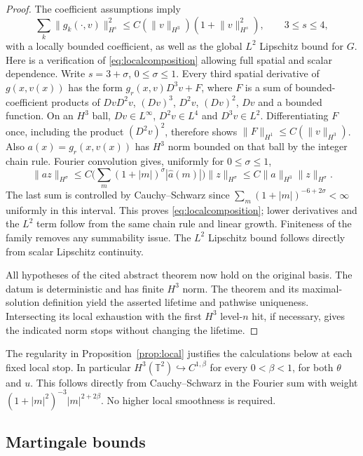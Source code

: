 \documentclass[11pt]{amsart}
\theoremstyle{remark}
\numberwithin{equation}{section}
\newcommand{\T}{\mathbb T}
\newcommand{\norm}[1]{\lVert#1\rVert}
\begin{document}
\begin{proof}
The coefficient assumptions imply
\begin{equation}\label{eq:localcomposition}
 \sum_k\norm{g_k(\cdot,v)}_{H^s}^2
 \leq C(\norm{v}_{H^3})(1+\norm{v}_{H^s}^2),\qquad 3\leq s\leq4,
\end{equation}
with a locally bounded coefficient, as well as the global $L^2$ Lipschitz
bound for $G$. Here is a verification of \eqref{eq:localcomposition} allowing
full spatial and scalar dependence. Write $s=3+\sigma$, $0\leq\sigma\leq1$.
Every third spatial derivative of $g(x,v(x))$ has the form
$g_r(x,v)D^3v+F$, where $F$ is a sum of bounded-coefficient products of
$DvD^2v$, $(Dv)^3$, $D^2v$, $(Dv)^2$, $Dv$ and a bounded function.
On an $H^3$ ball, $Dv\in L^\infty$, $D^2v\in L^4$ and $D^3v\in L^2$.
Differentiating $F$ once, including the product $(D^2v)^2$, therefore shows
$\norm{F}_{H^1}\leq C(\norm{v}_{H^3})$.
Also $a(x)=g_r(x,v(x))$ has $H^3$ norm bounded on that ball by the integer
chain rule. Fourier convolution gives, uniformly for $0\leq\sigma\leq1$,
\[
 \norm{az}_{H^\sigma}\leq
 C\Big(\sum_m(1+|m|)^\sigma|\widehat a(m)|\Big)\norm{z}_{H^\sigma}
 \leq C\norm{a}_{H^3}\norm{z}_{H^\sigma}.
\]
The last sum is controlled by Cauchy--Schwarz since
$\sum_m(1+|m|)^{-6+2\sigma}<\infty$ uniformly in this interval.
This proves \eqref{eq:localcomposition}; lower derivatives and the $L^2$ term
follow from the same chain rule and linear growth. Finiteness of the family
removes any summability issue. The $L^2$ Lipschitz bound follows directly from
scalar Lipschitz continuity.

All hypotheses of the cited abstract theorem now hold on the original basis.
The datum is deterministic and has finite $H^3$ norm. The theorem and its
maximal-solution definition yield the asserted lifetime and pathwise uniqueness.
Intersecting its local exhaustion with the first $H^3$ level-$n$ hit, if
necessary, gives the indicated norm stops without changing the lifetime.
\end{proof}

The regularity in Proposition~\ref{prop:local} justifies the calculations below
at each fixed local stop. In particular $H^3(\T^2)\hookrightarrow C^{1,\beta}$
for every $0<\beta<1$, for both $\theta$ and $u$. This follows directly from
Cauchy--Schwarz in the Fourier sum with weight
$(1+|m|^2)^{-3}|m|^{2+2\beta}$. No higher local smoothness is required.

\subsection{Martingale bounds}
\end{document}
